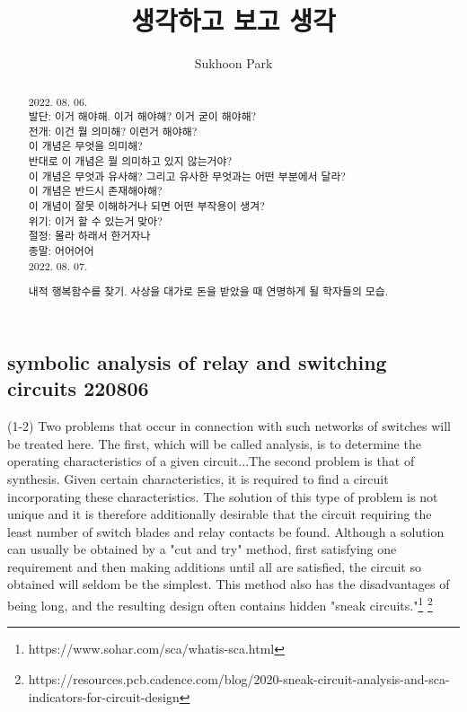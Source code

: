 \documentclass[11pt, a4paper]{article}
\begin{document}
\title{생각하고 보고 생각}
\author{Sukhoon Park}
\maketitle

\begin{abstract}

2022. 08. 06. \\
발단: 이거 해야해. 이거 해야해? 이거 굳이 해야해? \\
전개: 이건 뭘 의미해? 이런거 해야해? \\
이 개념은 무엇을 의미해? \\
반대로 이 개념은 뭘 의미하고 있지 않는거야? \\
이 개념은 무엇과 유사해? 그리고 유사한 무엇과는 어떤 부분에서 달라? \\
이 개념은 반드시 존재해야해? \\
이 개념이 잘못 이해하거나 되면 어떤 부작용이 생겨? \\
위기: 이거 할 수 있는거 맞아? \\
절정: 몰라 하래서 한거자나 \\
종말: 어어어어 \\

2022. 08. 07.

내적 행복함수를 찾기. 사상을 대가로 돈을 받았을 때 연명하게 될 학자들의 모습. \\


\end{abstract}


\newpage

\subsection{symbolic analysis of relay and switching circuits 220806}

(1-2) Two problems that occur in connection with such networks of switches will be treated here. The first, which will be called
analysis, is to determine the operating characteristics
of a given circuit...The second problem is that of synthesis. Given certain characteristics, it is required to find a circuit incorporating these characteristics. The solution of this type of problem is not unique and it is therefore additionally desirable that the circuit requiring the least number of switch blades and relay contacts be found. Although a solution can usually be
obtained by a "cut and try" method, first satisfying
one requirement and then making additions until all
are satisfied, the circuit so obtained will seldom
be the simplest. This method also has the disadvantages
of being long, and the resulting design often
contains hidden "sneak circuits."\footnote{https://www.sohar.com/sca/whatis-sca.html} \footnote{https://resources.pcb.cadence.com/blog/2020-sneak-circuit-analysis-and-sca-indicators-for-circuit-design}
\end{document}
